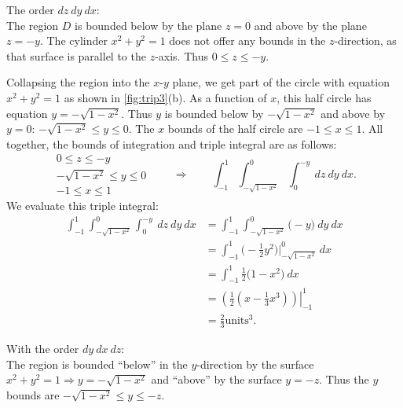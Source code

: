 {The order $dz\ dy\ dx$:\\

The region $D$ is bounded below by the plane $z=0$ and above by the plane $z=-y$. The cylinder $x^2+y^2=1$ does not offer any bounds in the $z$-direction, as that surface is parallel to the $z$-axis. Thus $0\leq z\leq -y$.

Collapsing the region into the $x$-$y$ plane, we get part of the circle with equation $x^2+y^2=1$ as shown in \autoref{fig:trip3}(b). As a function of $x$, this half circle has equation $y=-\sqrt{1-x^2}$. Thus $y$ is bounded below by $-\sqrt{1-x^2}$ and above by $y=0$: $-\sqrt{1-x^2}\leq y\leq 0$. The $x$ bounds of the half circle are $-1\leq x\leq 1$. All together, the bounds of integration and triple integral are  as follows:
\[
 \begin{gathered}
  0\leq z\leq -y\\
  -\sqrt{1-x^2}\leq y\leq 0\\
  -1\leq x\leq 1
 \end{gathered}
 \qquad\Rightarrow\qquad
 \int_{-1}^1\int_{-\sqrt{1-x^2}}^{0}\int_0^{-y}\ dz\ dy\ dx.
\]
We evaluate this triple integral:
\begin{align*}
	\int_{-1}^1\int_{-\sqrt{1-x^2}}^{0}\int_0^{-y}\ dz\ dy\ dx
	&= \int_{-1}^1\int_{-\sqrt{1-x^2}}^{0}\big(-y\big)\ dy\ dx\\
	&=\int_{-1}^1\big(-\frac12y^2\big)\Big|_{-\sqrt{1-x^2}}^{0}\ dx\\
	&= \int_{-1}^1 \frac12\big(1-x^2\big)\ dx\\
	&= \left.\left(\frac12\left(x-\frac13x^3\right)\right)\right|_{-1}^1\\
	&= \frac23\text{units}^3.
\end{align*}

\noindent With the order $dy\ dx\ dz$:\\

The region is bounded ``below'' in the $y$-direction by the surface $x^2+y^2=1 \Rightarrow y=-\sqrt{1-x^2}$ and ``above'' by the surface $y=-z$. Thus the $y$ bounds are $-\sqrt{1-x^2}\leq y\leq -z$.


}

